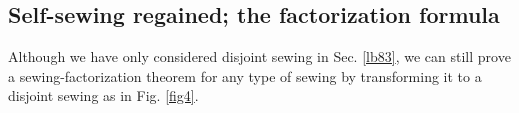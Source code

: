 \documentclass[11pt,b5paper,notitlepage]{article}
\theoremstyle{definition}
\theoremstyle{plain}
\newcommand{\<}{\left\langle}
\renewcommand{\>}{\right\rangle}
\numberwithin{equation}{subsection}
\begin{document}
\subsection{Self-sewing regained; the factorization formula}

Although we have only considered disjoint sewing in Sec. \ref{lb83}, we can still prove a sewing-factorization theorem for any type of sewing by transforming it to a disjoint sewing as in Fig. \ref{fig4}.

\begin{figure}[h]
	\centering
{}
\end{figure}
\end{document}
